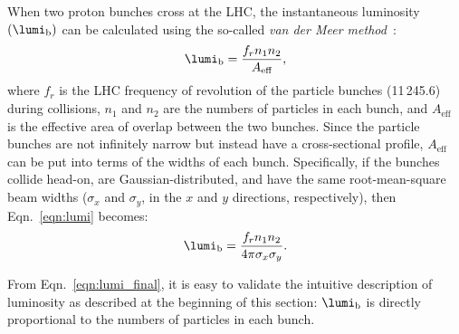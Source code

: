 When two proton bunches cross at the LHC, the instantaneous luminosity $\left( \lumi_\text{b}\right)$ can be calculated using the so-called \emph{van der Meer method}~\cite{LUM-17-003}:
\begin{equation}
    \lumi_\text{b} = \frac{f_r  n_1  n_2}{A_\text{eff}},
    \label{eqn:lumi}
\end{equation}
where $f_r$ is the LHC frequency of revolution of the particle bunches (11\,245.6\Hz) during collisions,
$n_1$ and $n_2$ are the numbers of particles in each bunch,
and $A_\text{eff}$ is the effective area of overlap between the two bunches.
Since the particle bunches are not infinitely narrow but instead have a cross-sectional profile, $A_\text{eff}$ can be put into terms of the widths of each bunch.
Specifically, if the bunches collide head-on, are Gaussian-distributed, and have the same root-mean-square beam widths ($\sigma_x$ and $\sigma_y$, in the $x$ and $y$ directions, respectively), then Eqn.~\ref{eqn:lumi} becomes:
\begin{equation}
    \lumi_\text{b} = \frac{f_r  n_1  n_2}{4\pi \sigma_x \sigma_y}.
    \label{eqn:lumi_final}
\end{equation}

From Eqn.~\ref{eqn:lumi_final}, it is easy to validate the intuitive description of luminosity as described at the beginning of this section:
$\lumi_\text{b}$ is directly proportional to the numbers of particles in each bunch.












